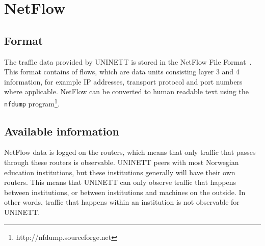 \chapter{NetFlow}
\label{chp:netflow}

\section{Format}
The traffic data provided by UNINETT is stored in the NetFlow File Format~\cite{cisco0netflow}.
This format contains of flows, which are data units consisting layer 3 and 4~\cite{zimmermann1980osi} information,
 for example IP addresses, transport protocol and port numbers where applicable.
NetFlow can be converted to human readable text using the \verb"nfdump" program\footnote{http://nfdump.sourceforge.net}.

\section{Available information}
%
%
NetFlow data is logged on the routers, which means that only traffic that passes through these routers is observable.
UNINETT peers with most Norwegian education institutions, but these institutions generally will have their own routers.
This means that UNINETT can only observe traffic that happens between institutions, or between institutions and machines on the outside.
In other words, traffic that happens within an institution is not observable for UNINETT.


